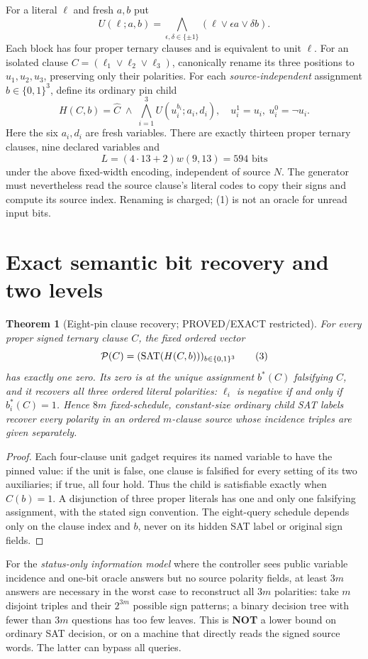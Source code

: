 \documentclass[11pt]{article}
\newtheorem{theorem}{Theorem}
\begin{document}
For a literal $\ell$ and fresh $a,b$ put
\[
 U(\ell;a,b)=\bigwedge_{\epsilon,\delta\in\{\pm1\}}
     (\ell\vee\epsilon a\vee\delta b).
\]
Each block has four proper ternary clauses and is equivalent to unit $\ell$.
For an isolated clause $C=(\ell_1\vee\ell_2\vee\ell_3)$,
canonically rename its three positions to $u_1,u_2,u_3$, preserving only
their polarities. For each \emph{source-independent} assignment
$b\in\{0,1\}^3$, define its ordinary pin child
\[
 H(C,b)=\widehat C\;\wedge\;
 \bigwedge_{i=1}^3 U(u_i^{b_i};a_i,d_i),\quad
 u_i^{1}=u_i,\ u_i^{0}=\neg u_i.
 \tag{1}
\]
Here the six $a_i,d_i$ are fresh variables. There are exactly thirteen
proper ternary clauses, nine declared variables and
\[
 L=(4\cdot13+2)w(9,13)=594 \text{ bits}
 \tag{2}
\]
under the above fixed-width encoding, independent of source $N$.
The generator must nevertheless read the source clause's literal
codes to copy their signs and compute its source index. Renaming is charged;
(1) is not an oracle for unread input bits.

\section{Exact semantic bit recovery and two levels}
\begin{theorem}[Eight-pin clause recovery; PROVED/EXACT restricted]
For every proper signed ternary clause $C$, the fixed ordered vector
\[
 {\cal P}(C)=(\operatorname{SAT}(H(C,b)))_{b\in\{0,1\}^3}
 \tag{3}
\]
has exactly one zero. Its zero is at the unique assignment $b^*(C)$
falsifying $C$, and it recovers all three ordered literal polarities:
$\ell_i$ is negative if and only if $b_i^*(C)=1$.
Hence $8m$ fixed-schedule, constant-size ordinary child SAT labels
recover every polarity in an ordered $m$-clause source whose incidence
triples are given separately.
\end{theorem}
\begin{proof}
Each four-clause unit gadget requires its named variable to have the
pinned value: if the unit is false, one clause is falsified for every
setting of its two auxiliaries; if true, all four hold. Thus the child
is satisfiable exactly when $C(b)=1$. A disjunction of three proper
literals has one and only one falsifying assignment, with the stated
sign convention. The eight-query schedule depends only on the clause
index and $b$, never on its hidden SAT label or original sign fields.
\end{proof}

For the \emph{status-only information model} where the controller sees
public variable incidence and one-bit oracle answers but no source
polarity fields, at least $3m$ answers are necessary in the worst case
to reconstruct all $3m$ polarities: take $m$ disjoint triples and their
$2^{3m}$ possible sign patterns; a binary decision tree with fewer than
$3m$ questions has too few leaves. This is \textbf{NOT} a lower bound
on ordinary SAT decision, or on a machine that directly reads the
signed source words. The latter can bypass all queries.
\end{document}

